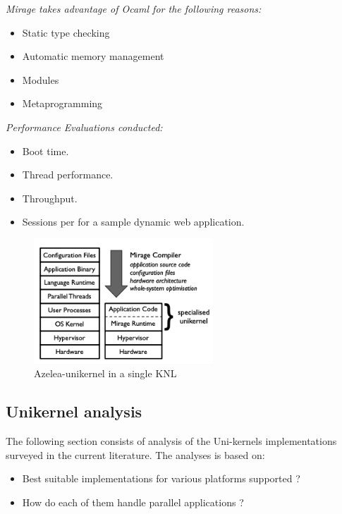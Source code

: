   \emph{Mirage takes advantage of Ocaml for the following reasons:}
  \begin{itemize}
    \item Static type checking
    \item Automatic memory management
    \item Modules
    \item Metaprogramming
  \end{itemize}

  \emph{Performance Evaluations conducted:}
  \begin{itemize}
    \item Boot time.
    \item Thread performance.
    \item Throughput.
    \item Sessions per for a sample dynamic web application.
  \end{itemize}
  
  \begin{figure}[htbp!] 
    \centering    
    \includegraphics[width=0.6\textwidth]{Mirage}
    \caption[Mirage]{Azelea-unikernel in a single KNL \cite{Azelea}}
    \label{fig:Mirage}
    \end{figure}

\subsection{Unikernel analysis}
The following section consists of analysis of the Uni-kernels 
implementations surveyed in the current literature. The 
analyses is based on: 
\begin{itemize}
\item Best suitable implementations for various platforms supported ? 
\item How do each of them handle parallel applications ?
\end{itemize}


